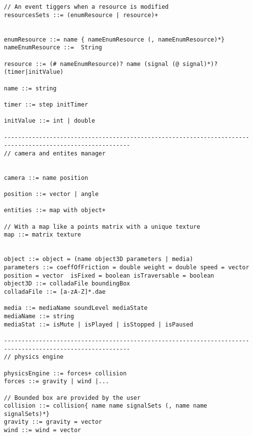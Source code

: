 \begin{lstlisting}[language=Grammar]
// An event tiggers when a resource is modified
resourcesSets ::= (enumResource | resource)+


enumResource ::= name { nameEnumResource (, nameEnumResource)*}
nameEnumResource ::=  String

resource ::= (# nameEnumResource)? name (signal (@ signal)*)? (timer|initValue)

name ::= string

timer ::= step initTimer

initValue ::= int | double

----------------------------------------------------------------------------------------------------------
// camera and entites manager


camera ::= name position

position ::= vector | angle

entities ::= map with object+

// With a map like a points matrix with a unique texture
map ::= matrix texture


object ::= object = (name object3D parameters | media)
parameters ::= coeffOfFriction = double weight = double speed = vector position = vector  isFixed = boolean isTraversable = boolean
object3D ::= colladaFile boundingBox
colladaFile ::= [a-zA-Z]*.dae

media ::= mediaName soundLevel mediaState
mediaName ::= string
mediaStat ::= isMute | isPlayed | isStopped | isPaused

----------------------------------------------------------------------------------------------------------
// physics engine

physicsEngine ::= forces+ collision
forces ::= gravity | wind |...

// Bounded box are provided by the user
collision ::= collision{ name name signalSets (, name name signalSets)*}
gravity ::= gravity = vector
wind ::= wind = vector


\end{lstlisting}
